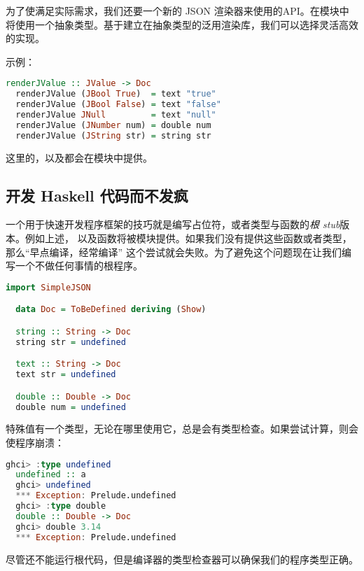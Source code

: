 \documentclass[./main.tex]{subfiles}
\begin{document}
为了使满足实际需求，我们还要一个新的 JSON 渲染器来使用的API。在模块中
将使用一个抽象类型。基于建立在抽象类型的泛用渲染库，我们可以选择灵活高效的实现。

示例：

\begin{lstlisting}[language=Haskell]
  renderJValue :: JValue -> Doc
  renderJValue (JBool True)  = text "true"
  renderJValue (JBool False) = text "false"
  renderJValue JNull         = text "null"
  renderJValue (JNumber num) = double num
  renderJValue (JString str) = string str
\end{lstlisting}

这里的，以及都会在模块中提供。

\subsection*{开发 Haskell 代码而不发疯}

一个用于快速开发程序框架的技巧就是编写占位符，或者类型与函数的\textit{根 stub}版本。例如上述，
以及函数将被模块提供。如果我们没有提供这些函数或者类型，那么“早点编译，经常编译”
这个尝试就会失败。为了避免这个问题现在让我们编写一个不做任何事情的根程序。

\begin{lstlisting}[language=Haskell]
  import SimpleJSON

  data Doc = ToBeDefined deriving (Show)

  string :: String -> Doc
  string str = undefined

  text :: String -> Doc
  text str = undefined

  double :: Double -> Doc
  double num = undefined
\end{lstlisting}

特殊值有一个类型，无论在哪里使用它，总是会有类型检查。如果尝试计算，则会使程序崩溃：

\begin{lstlisting}[language=Haskell]
  ghci> :type undefined
  undefined :: a
  ghci> undefined
  *** Exception: Prelude.undefined
  ghci> :type double
  double :: Double -> Doc
  ghci> double 3.14
  *** Exception: Prelude.undefined
\end{lstlisting}

尽管还不能运行根代码，但是编译器的类型检查器可以确保我们的程序类型正确。
\end{document}
